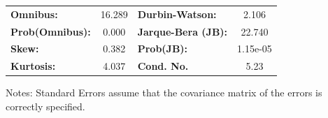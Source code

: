 \begin{center}
\begin{tabular}{lcccccc}
\bottomrule
\end{tabular}
\begin{tabular}{lclc}
\textbf{Omnibus:}       & 16.289 & \textbf{  Durbin-Watson:     } &    2.106  \\
\textbf{Prob(Omnibus):} &  0.000 & \textbf{  Jarque-Bera (JB):  } &   22.740  \\
\textbf{Skew:}          &  0.382 & \textbf{  Prob(JB):          } & 1.15e-05  \\
\textbf{Kurtosis:}      &  4.037 & \textbf{  Cond. No.          } &     5.23  \\
\bottomrule
\end{tabular}
\end{center}

Notes: \newline
 [1] Standard Errors assume that the covariance matrix of the errors is correctly specified.